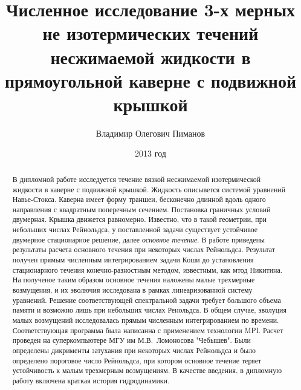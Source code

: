 \documentclass[a4paper,10pt]{article}
\title{Численное исследование 3-х мерных не изотермических течений несжимаемой жидкости в прямоугольной каверне с подвижной крышкой}
\author{Владимир Олегович Пиманов}
\date{2013 год}
\begin{document}

 \maketitle

\begin{abstract}
  В дипломной работе исследуется течение вязкой несжимаемой изотермической жидкости в каверне с подвижной крышкой. 
  Жидкость описывется системой уравнений Навье-Стокса. Каверна имеет форму траншеи, бесконечно длинной 
  вдоль одного направления с квадратным поперечным сечением. Постановка граничных условий двумерная. 
  Крышка движется равномерно. Известно, что в такой геометрии, при небольших числах Рейнольдса, у поставленной задачи
  существует устойчивое двумерное стационарное решение, далее \textit{основное течение}. В работе приведены результаты
  расчета основного течения при некоторых числах Рейнольдса. Результат получен прямым численным интегрированием задачи 
  Коши до установления стационарного течения конечно-разностным методом, известным, как мтод Никитина. 
  На полученое таким образом основное течения наложены малые 
  трехмерные возмущения, и их эволючия исследована в рамках линеаризованной систему уравнений. Решение 
  соответствующей спектральной задачи требует большого объема памяти и возможно лишь при небольших числах Ренольдса.
  В общем случае, эволуция малых возмущений исследовалась прямым численным интегрированием по времени. 
  Соответствующая программа была написанна с применением технологии MPI. Расчет проведен на суперкомпьютере 
  МГУ им М.В.~Ломоносова "Чебышев". Были определены дикрименты затухания при некоторых числах Рейнольдса и было 
  определено пороговое число Рейнольдса, при котором основное течение теряет устойчивость к малым трехмерным возмущениям. 
  В качестве введения, в дипломную работу включена краткая история гидродинамики.
\end{abstract}
\newpage  

  
  
%  
  
  
%  
  
  
\end{document}
